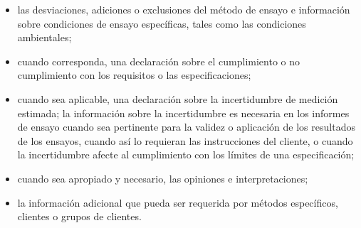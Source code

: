 \begin{itemize}
	\item las desviaciones, adiciones o exclusiones del método de ensayo e información sobre condiciones de
	ensayo específicas, tales como las condiciones ambientales;
	
	\item cuando corresponda, una declaración sobre el cumplimiento o no cumplimiento con los requisitos o las
	especificaciones;
	
	\item cuando sea aplicable, una declaración sobre la incertidumbre de medición estimada; la información
	sobre la incertidumbre es necesaria en los informes de ensayo cuando sea pertinente para la validez o
	aplicación de los resultados de los ensayos, cuando así lo requieran las instrucciones del cliente, o
	cuando la incertidumbre afecte al cumplimiento con los límites de una especificación;
	
	\item cuando sea apropiado y necesario, las opiniones e interpretaciones;
	
	\item la información adicional que pueda ser requerida por métodos específicos, clientes o grupos de clientes.
\end{itemize}
